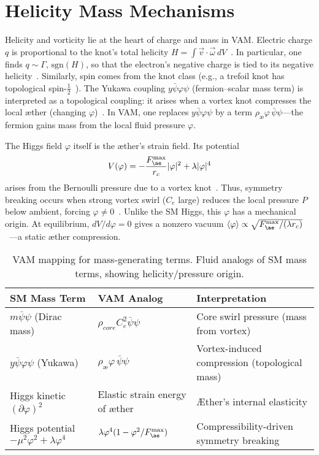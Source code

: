 \documentclass[a4paper,12pt]{article}
\begin{document}
\chapter*{Helicity Mass Mechanisms}

Helicity and vorticity lie at the heart of charge and mass in VAM. Electric charge $q$ is proportional to the knot's total helicity $H=\int\vec{v}\cdot\vec{\omega}\,dV$~\cite{vam-helicity}. In particular, one finds $q\sim \Gamma,\,\mathrm{sgn}(H)$, so that the electron's negative charge is tied to its negative helicity~\cite{vam-helicity}. Similarly, spin comes from the knot class (e.g., a trefoil knot has topological spin-$\frac{1}{2}$~\cite{vam-helicity}). The Yukawa coupling $y\bar{\psi}\varphi\psi$ (fermion--scalar mass term) is interpreted as a topological coupling: it arises when a vortex knot compresses the local æther (changing $\varphi$)~\cite{vam-lagrangian}. In VAM, one replaces $y\bar{\psi}\varphi\psi$ by a term $\rho_{æ}\varphi\,\bar{\psi}\psi$---the fermion gains mass from the local fluid pressure $\varphi$.

The Higgs field $\varphi$ itself is the æther's strain field. Its potential
\begin{equation}
    V(\varphi) = -\frac{F_{æ}^{\rm max}}{r_c}|\varphi|^2 + \lambda|\varphi|^4
\end{equation}
arises from the Bernoulli pressure due to a vortex knot~\cite{vam-lagrangian}. Thus, symmetry breaking occurs when strong vortex swirl ($C_e$ large) reduces the local pressure $P$ below ambient, forcing $\varphi\neq0$~\cite{vam-lagrangian}. Unlike the SM Higgs, this $\varphi$ has a mechanical origin. At equilibrium, $dV/d\varphi=0$ gives a nonzero vacuum $\langle\varphi\rangle\propto\sqrt{F_{æ}^{\rm max}/(\lambda r_c)}$~\cite{vam-lagrangian}---a static æther compression.

\begin{table}[H]
    \centering
    \begin{tabular}{lll}
        \toprule
        \textbf{SM Mass Term} & \textbf{VAM Analog} & \textbf{Interpretation} \\
        \midrule
        $m\bar{\psi}\psi$ (Dirac mass) & $\rho_{core}C_e^2\bar{\psi}\psi$ & Core swirl pressure (mass from vortex) \\
        $y\bar{\psi}\varphi\psi$ (Yukawa) & $\rho_{æ}\varphi\,\bar{\psi}\psi$ & Vortex-induced compression (topological mass) \\
        Higgs kinetic $(\partial\varphi)^2$ & Elastic strain energy of æther & Æther's internal elasticity \\
        Higgs potential $-\mu^2\varphi^2+\lambda\varphi^4$ & $\lambda\varphi^4(1-\varphi^2/F_{æ}^{\rm max})$ & Compressibility-driven symmetry breaking \\
        \bottomrule
    \end{tabular}
    \caption{VAM mapping for mass-generating terms. Fluid analogs of SM mass terms, showing helicity/pressure origin.}
    \label{tab:mass-map}
\end{table}
\end{document}
